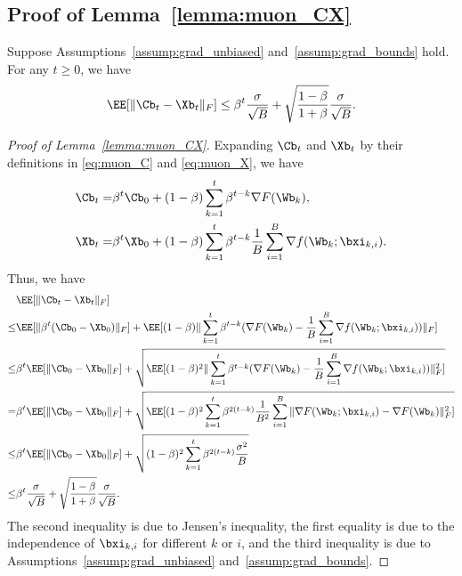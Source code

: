 \documentclass[11pt, letterpaper]{article}
\begin{document}
\subsection{Proof of Lemma~\ref{lemma:muon_CX}}
\begin{lemma}\label{lemma:muon_CX}
    Suppose Assumptions~\ref{assump:grad_unbiased} and~\ref{assump:grad_bounds} hold. For any $t\ge 0$, we have
    \begin{align*}
        \EE[\|\Cb_t - \Xb_t\|_F] \le \beta^t\frac{\sigma}{\sqrt{B}} + \sqrt{\frac{1-\beta}{1+\beta}}\frac{\sigma}{\sqrt{B}}.
    \end{align*}
\end{lemma}
\begin{proof}[Proof of Lemma~\ref{lemma:muon_CX}]
    Expanding $\Cb_t$ and $\Xb_t$ by their definitions in \eqref{eq:muon_C} and \eqref{eq:muon_X}, we have
    \begin{align*}
        \Cb_t =& \beta^t\Cb_0 + (1-\beta)\sum_{k=1}^t\beta^{t-k}\nabla F(\Wb_k) , \\
        \Xb_t =& \beta^t\Xb_0 + (1-\beta)\sum_{k=1}^t\beta^{t-k}\frac{1}{B}\sum_{i=1}^B\nabla f(\Wb_k;\bxi_{k,i}).
    \end{align*}
    Thus, we have
    \begin{align*}
        &\EE[\|\Cb_t - \Xb_t\|_F] \\
        \le& \EE[\|\beta^t(\Cb_0 - \Xb_0)\|_F] + \EE[(1-\beta)\|\sum_{k=1}^t\beta^{t-k}(\nabla F(\Wb_k)-\frac{1}{B}\sum_{i=1}^B\nabla f(\Wb_k;\bxi_{k,i}))\|_F] \\ 
        \le& \beta^t\EE[\|\Cb_0 - \Xb_0\|_F] + \sqrt{\EE[(1-\beta)^2\|\sum_{k=1}^t\beta^{t-k}(\nabla F(\Wb_k)-\frac{1}{B}\sum_{i=1}^B\nabla f(\Wb_k;\bxi_{k,i}))\|_F^2]} \\
        =& \beta^t\EE[\|\Cb_0 - \Xb_0\|_F] + \sqrt{\EE[(1-\beta)^2\sum_{k=1}^t\beta^{2(t-k)}\frac{1}{B^2}\sum_{i=1}^B\|\nabla F(\Wb_k;\bxi_{k,i})-\nabla F(\Wb_k)\|_F^2]} \\
        \le& \beta^t\EE[\|\Cb_0 - \Xb_0\|_F] + \sqrt{(1-\beta)^2\sum_{k=1}^t\beta^{2(t-k)}\frac{\sigma^2}{B}} \\
        \le& \beta^t\frac{\sigma}{\sqrt{B}} + \sqrt{\frac{1-\beta}{1+\beta}}\frac{\sigma}{\sqrt{B}}.
    \end{align*}
    The second inequality is due to Jensen's inequality, the first equality is due to the independence of $\bxi_{k,i}$ for different $k$ or $i$, and the third inequality is due to Assumptions~\ref{assump:grad_unbiased} and~\ref{assump:grad_bounds}.
\end{proof}
\end{document}
